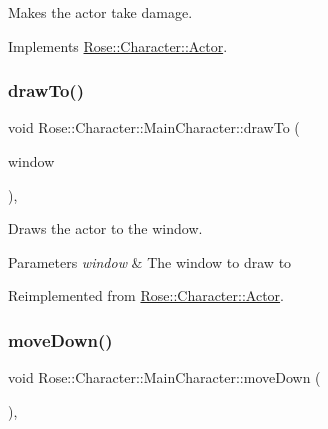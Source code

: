 Makes the actor take damage. 



Implements \mbox{\hyperlink{classRose_1_1Character_1_1Actor_a8d835beb192c864967c7a9b3a5f7f579}{Rose\+::\+Character\+::\+Actor}}.

\mbox{\label{classRose_1_1Character_1_1MainCharacter_a6c30ae81a27fa3cc5fff16ebe7c9f8be}} 
\subsubsection{\texorpdfstring{drawTo()}{drawTo()}}
{\footnotesize\ttfamily void Rose\+::\+Character\+::\+Main\+Character\+::draw\+To (\begin{DoxyParamCaption}\item[{sf\+::\+Render\+Window \&}]{window }\end{DoxyParamCaption})\hspace{0.3cm}{\ttfamily [override]}, {\ttfamily [virtual]}}



Draws the actor to the window. 


\begin{DoxyParams}{Parameters}
{\em window} & The window to draw to \\
\hline
\end{DoxyParams}


Reimplemented from \mbox{\hyperlink{classRose_1_1Character_1_1Actor_a1433ef76e892a8c57597115071c256d8}{Rose\+::\+Character\+::\+Actor}}.

\mbox{\label{classRose_1_1Character_1_1MainCharacter_ac6a35f90921775e254bbb723998e84cd}} 
\subsubsection{\texorpdfstring{moveDown()}{moveDown()}}
{\footnotesize\ttfamily void Rose\+::\+Character\+::\+Main\+Character\+::move\+Down (\begin{DoxyParamCaption}{ }\end{DoxyParamCaption})\hspace{0.3cm}{\ttfamily [override]}, {\ttfamily [virtual]}}



